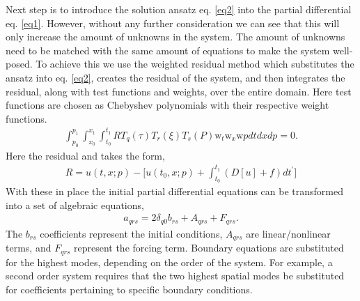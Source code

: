 \documentclass{article}
\begin{document}
Next step is to introduce the solution ansatz eq. \ref{eq2} into the partial differential eq. \ref{eq1}. However, without any further consideration we can see that this will only increase the amount of unknowns in the system. The amount of unknowns need to be matched with the same amount of equations to make the system well-posed. To achieve this we use the weighted residual method which substitutes the ansatz into eq. \ref{eq2}, creates the residual of the system, and then integrates the residual, along with test functions and weights, over the entire domain. Here test functions are chosen as Chebyshev polynomials with their respective weight functions.
\begin{align}
\int_{p_0}^{p_1}\int_{x_0}^{x_1}\int_{t_0}^{t_1}RT_q(\tau)T_r(\xi)T_s(P)\text{w}_t\text{w}_x\text{w}p dtdxdp = 0.
\label{eq3}
\end{align}
Here the residual and takes the form,
\begin{align}
R = u(t,x;p) - \Big[u(t_0,x;p) + \int_{t_0}^{t_1}(D[u] + f)dt^{\prime}\Big]
\label{eq4}
\end{align}
With these in place the initial partial differential equations can be transformed into a set of algebraic equations,
\begin{align}
a_{qrs} = 2\delta_{q0}b_{rs} + A_{qrs} + F_{qrs}.
\label{eq5}
\end{align}
The $b_{rs}$ coefficients represent the initial conditions, $A_{qrs}$ are linear/nonlinear terms, and $F_{qrs}$ represent the forcing term. Boundary equations are substituted for the highest modes, depending on the order of the system. For example, a second order system requires that the two highest spatial modes be substituted for coefficients pertaining to specific boundary conditions.
\end{document}

